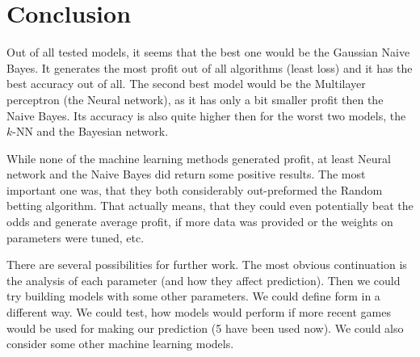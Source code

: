 \documentclass[conference]{IEEEtran}
\begin{document}
\section{Conclusion}

Out of all tested models, it seems that the best one would be the Gaussian Naive Bayes. It 
generates the most profit out of all algorithms (least loss) and it has the best accuracy 
out of all. The second best model would be the Multilayer perceptron (the Neural network),
as it has only a bit smaller profit then the Naive Bayes. Its accuracy is also quite higher then for
the worst two models, the $k$-NN and the Bayesian network.

While none of the machine learning methods generated profit, at least Neural network and the
Naive Bayes did return some positive results. The most important one was, that they both 
considerably out-preformed the Random betting algorithm. That actually means, that they could
even potentially beat the odds and generate average profit, if more data was provided or the 
weights on parameters were tuned, etc.

There are several possibilities for further work. The most obvious continuation is the analysis 
of each parameter (and how they affect prediction). Then we could try building models with some other
parameters. We could define form in a different way. We could test, how models would perform if
more recent games would be used for making our prediction (5 have been used now). We could also
consider some other machine learning models.


 
\end{document}
